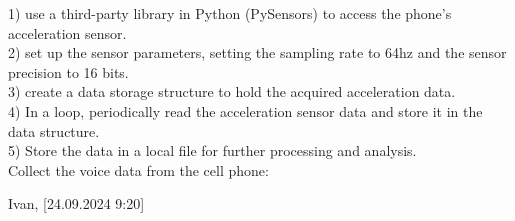 \documentclass[a4paper,10pt,twocolumn]{article}
\begin{document}
\begin{flushleft}
1) use a third-party library in Python (PySensors) to
access the phone’s acceleration sensor.\\
2) set up the sensor parameters, setting the sampling
rate to 64hz and the sensor precision to 16 bits.\\
3) create a data storage structure to hold the acquired
acceleration data.\\
4) In a loop, periodically read the acceleration sensor
data and store it in the data structure.\\
5) Store the data in a local file for further processing
and analysis.\\
Collect the voice data from the cell phone:

Ivan, [24.09.2024 9:20]
\end{flushleft}
\end{document}
